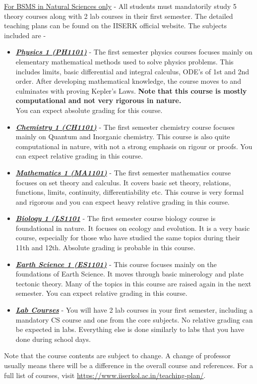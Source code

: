 \documentclass[openany]{book}
\begin{document}
\underline{For BSMS in Natural Sciences only} - All students must mandatorily study 5 theory courses along with 2 lab courses in their first semester. The detailed teaching plans can be found on the IISERK official website. The subjects included are - 
\begin{itemize}
    \item \underline{\textbf{\textit{Physics 1 (PH1101)}}} - The first semester physics courses focuses mainly on elementary mathematical methods used to solve physics problems. This includes limits, basic differential and integral calculus, ODE's of 1st and 2nd order. After developing mathematical knowledge, the course moves to and culminates with proving Kepler's Laws.
    \textbf{Note that this course is mostly computational and not very rigorous in nature.} \\ 
    You can expect absolute grading for this course. 
    \item \underline{\textbf{\textit{Chemistry 1 (CH1101)}}} - The first semester chemistry course focuses mainly on Quantum and Inorganic chemistry. This course is also quite computational in nature, with not a strong emphasis on rigour or proofs. You can expect relative grading in this course. 
    \item \underline{\textbf{\textit{Mathematics 1 (MA1101)}}} - The first semester mathematics course focuses on set theory and calculus. It covers basic set theory, relations, functions, limits, continuity, differentiability etc. This course is very formal and rigorous and you can expect heavy relative grading in this course. 
    \item \underline{\textbf{\textit{Biology 1 (LS1101}}} - The first semester course biology course is foundational in nature. It focuses on ecology and evolution. It is a very basic course, especially for those who have studied the same topics during their 11th and 12th. Absolute grading is probable in this course. 
    \item \underline{\textbf{\textit{Earth Science 1 (ES1101)}}} - This course focuses mainly on the foundations of Earth Science. It moves through basic minerology and plate tectonic theory. Many of the topics in this course are raised again in the next semester. You can expect relative grading in this course. 
    \item \underline{\textbf{\textit{Lab Courses}}} - You will have 2 lab courses in your first semester, including a mandatory CS course and one from the core subjects. No relative grading can be expected in labs. Everything else is done similarly to labs that you have done during school days. 
\end{itemize}
\begin{mynote}
    Note that the course contents are subject to change. A change of professor usually means there will be a difference in the overall course and references. For a full list of courses, visit \textcolor{red}{\url{https://www.iiserkol.ac.in/teaching-plan/}}.
\end{mynote}
\end{document}
